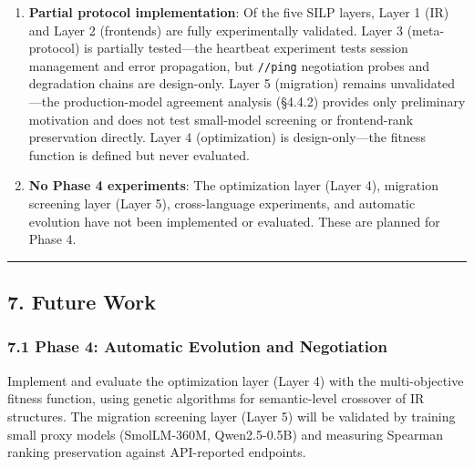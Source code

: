 \begin{enumerate}
  \textbf{27 test cases}: While the 27 cases span 9 semantic categories with 3 difficulty variants, they may not represent the full diversity of agent-to-agent communication tasks (e.g., multi-modal, long-horizon planning, negotiation).

\item

  \textbf{Partial protocol implementation}: Of the five SILP layers, Layer 1 (IR) and Layer 2 (frontends) are fully experimentally validated. Layer 3 (meta-protocol) is partially tested---the heartbeat experiment tests session management and error propagation, but \texttt{//ping} negotiation probes and degradation chains are design-only. Layer 5 (migration) remains unvalidated---the production-model agreement analysis (§4.4.2) provides only preliminary motivation and does not test small-model screening or frontend-rank preservation directly. Layer 4 (optimization) is design-only---the fitness function is defined but never evaluated.

\item

  \textbf{No Phase 4 experiments}: The optimization layer (Layer 4), migration screening layer (Layer 5), cross-language experiments, and automatic evolution have not been implemented or evaluated. These are planned for Phase 4.

\end{enumerate}



\begin{center}\rule{0.5\linewidth}{0.5pt}\end{center}



\subsection{7. Future Work}\label{future-work}



\subsubsection{7.1 Phase 4: Automatic Evolution and Negotiation}\label{phase-4-automatic-evolution-and-negotiation}



Implement and evaluate the optimization layer (Layer 4) with the multi-objective fitness function, using genetic algorithms for semantic-level crossover of IR structures. The migration screening layer (Layer 5) will be validated by training small proxy models (SmolLM-360M, Qwen2.5-0.5B) and measuring Spearman ranking preservation against API-reported endpoints.



